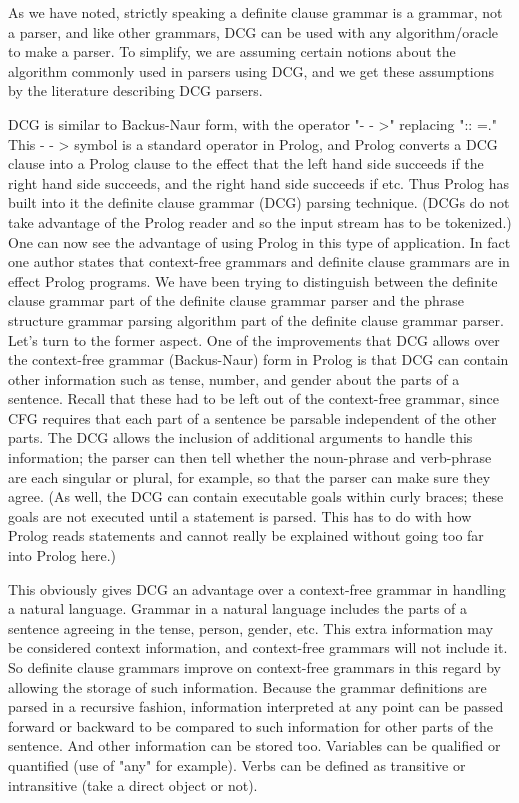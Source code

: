 As we have noted, strictly speaking a definite clause grammar is a grammar, not a parser, and like other grammars, DCG can be used with any algorithm/oracle to make a parser. To simplify, we are assuming certain notions about the algorithm commonly used in parsers using DCG, and we get these assumptions by the literature describing DCG parsers.

DCG is similar to Backus-Naur form, with the operator "- - >" replacing ":: =." This - - > symbol is a standard operator in Prolog, and Prolog converts a DCG clause into a Prolog clause to the effect that the left hand side succeeds if the right hand side succeeds, and the right hand side succeeds if etc. Thus Prolog has built into it the definite clause grammar (DCG) parsing technique. (DCGs do not take advantage of the Prolog reader and so the input stream has to be tokenized.) One can now see the advantage of using Prolog in this type of application. In fact one author states that context-free grammars and definite clause grammars are in effect Prolog programs.
We have been trying to distinguish between the definite clause grammar part of the definite clause grammar parser and the phrase structure grammar parsing algorithm part of the definite clause grammar parser. Let's turn to the former aspect. One of the improvements that DCG allows over the context-free grammar (Backus-Naur) form in Prolog is that DCG can contain other information such as tense, number, and gender about the parts of a sentence. Recall that these had to be left out of the context-free grammar, since CFG requires that each part of a sentence be parsable independent of the other parts. The DCG allows the inclusion of additional arguments to handle this information; the parser can then tell whether the noun-phrase and verb-phrase are each singular or plural, for example, so that the parser can make sure they agree. (As well, the DCG can contain executable goals within curly braces; these goals are not executed until a statement is parsed. This has to do with how Prolog reads statements and cannot really be explained without going too far into Prolog here.)

This obviously gives DCG an advantage over a context-free grammar in handling a natural language. Grammar in a natural language includes the parts of a sentence agreeing in the tense, person, gender, etc. This extra information may be considered context information, and context-free grammars will not include it. So definite clause grammars improve on context-free grammars in this regard by allowing the storage of such information. Because the grammar definitions are parsed in a recursive fashion, information interpreted at any point can be passed forward or backward to be compared to such information for other parts of the sentence. And other information can be stored too. Variables can be qualified or quantified (use of "any" for example). Verbs can be defined as transitive or intransitive (take a direct object or not).

